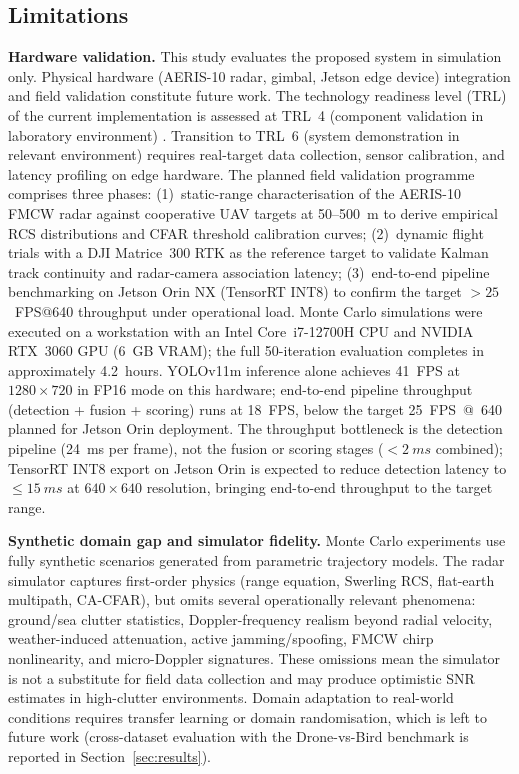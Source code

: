 \documentclass[drones,article,submit,pdftex]{Definitions/mdpi}
\begin{document}
\subsection{Limitations}

\textbf{Hardware validation.}
This study evaluates the proposed system in simulation only.
Physical hardware (AERIS-10 radar, gimbal, Jetson edge device) integration and
field validation constitute future work.
The technology readiness level (TRL) of the current implementation is assessed
at TRL~4 (component validation in laboratory environment) \cite{ref_trl}.
Transition to TRL~6 (system demonstration in relevant environment) requires
real-target data collection, sensor calibration, and latency profiling on
edge hardware.
The planned field validation programme comprises three phases:
(1)~static-range characterisation of the AERIS-10 FMCW radar against
cooperative UAV targets at 50--500~m to derive empirical RCS distributions
and CFAR threshold calibration curves;
(2)~dynamic flight trials with a DJI Matrice~300 RTK as the reference target
to validate Kalman track continuity and radar-camera association latency;
(3)~end-to-end pipeline benchmarking on Jetson Orin NX (TensorRT INT8) to
confirm the target $>25$~FPS@640 throughput under operational load.
Monte Carlo simulations were executed on a workstation with an Intel Core~i7-12700H
CPU and NVIDIA RTX~3060 GPU (6~GB VRAM); the full 50-iteration evaluation
completes in approximately \SI{4.2}{hours}.
YOLOv11m inference alone achieves \SI{41}{FPS} at $1280\times720$ in FP16 mode
on this hardware; end-to-end pipeline throughput (detection + fusion + scoring)
runs at \SI{18}{FPS}, below the target \SI{25}{FPS@640} planned for
Jetson Orin deployment.
The throughput bottleneck is the detection pipeline (\SI{24}{ms} per frame),
not the fusion or scoring stages ($<\SI{2}{ms}$ combined); TensorRT INT8
export on Jetson Orin is expected to reduce detection latency to $\leq\SI{15}{ms}$
at $640\times640$ resolution, bringing end-to-end throughput to the target range.

\textbf{Synthetic domain gap and simulator fidelity.}
Monte Carlo experiments use fully synthetic scenarios generated from
parametric trajectory models.
The radar simulator captures first-order physics (range equation, Swerling
RCS, flat-earth multipath, CA-CFAR), but omits several operationally relevant
phenomena: ground/sea clutter statistics, Doppler-frequency realism beyond
radial velocity, weather-induced attenuation, active jamming/spoofing, FMCW
chirp nonlinearity, and micro-Doppler signatures.
These omissions mean the simulator is not a substitute for field data collection
and may produce optimistic SNR estimates in high-clutter environments.
Domain adaptation to real-world conditions requires transfer learning or
domain randomisation, which is left to future work (cross-dataset evaluation with
the Drone-vs-Bird benchmark \cite{ref_drone_vs_bird} is reported in
Section~\ref{sec:results}).
\end{document}
